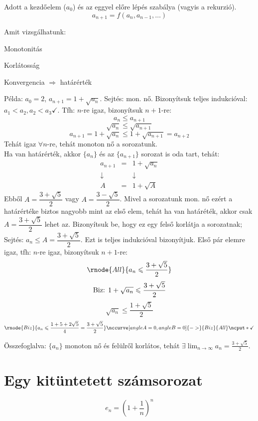\documentclass[a4paper,12pt,twoside]{book}
\theoremstyle{break}
\theoremstyle{plain}
\begin{document}
Adott a kezdőelem ($a_0$) és az eggyel előre lépés szabálya (vagyis a rekurzió).
\[a_{n+1} = f(a_n, a_{n-1}, \ldots)\]

Amit vizsgálhatunk:
\begin{itemize*}
 \item Monotonitás
 \item Korlátosság
 \item Konvergencia $\Rightarrow$ határérték
\end{itemize*}

Példa: $a_0 = 2$, $a_{n+1} = 1+\sqrt{a_n}$. Sejtés: mon. nő. Bizonyítsuk teljes indukcióval:
$a_1 < a_2, a_2 < a_3 \checkmark$. Tfh: $n$-re igaz, bizonyítsuk $n+1$-re:
\[a_n \leqslant a_{n+1}\]
\[\sqrt{a_n} \leqslant \sqrt{a_{n+1}}\]
\[a_{n+1}=1+\sqrt{a_n} \leqslant 1+\sqrt{a_{n+1}} = a_{n+2}\]
Tehát igaz $\forall n$-re, tehát monoton nő a sorozatunk.\\

Ha van határérték, akkor $\{a_n\}$ és az $\{a_{n+1}\}$ sorozat is oda tart, tehát:
\[\begin{array}{ccc}
   a_{n+1} & = & 1+\sqrt{a_n}\\
   \downarrow && \downarrow\\
   A & = & 1+ \sqrt{A}
  \end{array}
\]
Ebből $A=\dfrac{3+\sqrt{5}}{2}$ vagy $A=\dfrac{3-\sqrt{5}}{2}$. Mivel a sorozatunk mon. nő ezért a határértéke biztos nagyobb mint az első elem, tehát ha van határéték, akkor csak $A=\dfrac{3+\sqrt{5}}{2}$ lehet az. Bizonyítsuk be, hogy ez egy felső korlátja a sorozatnak; Sejtés: $a_n \leqslant A = \dfrac{3+\sqrt{5}}{2}$. Ezt is teljes indukcióval bizonyítjuk. Első pár elemre igaz, tfh: $n$-re igaz, bizonyítsuk $n+1$-re:
\[\rnode{All}{a_n \leqslant \dfrac{3+\sqrt{5}}{2}}\]
\[\hbox{Biz: }1+\sqrt{a_n} \leqslant \dfrac{3+\sqrt{5}}{2}\]
\[\sqrt{a_n} \leqslant \dfrac{1+\sqrt{5}}{2}\]
\[\rnode{Biz}{a_n \leqslant \dfrac{1+5+2\sqrt{5}}{4} = \frac{3+\sqrt{5}}{2}} \nccurve[angleA=0, angleB=0]{->}{Biz}{All} \ncput*{\checkmark}\]

Összefoglalva: $\{a_n\}$ monoton nő és felülről korlátos, tehát $\displaystyle \exists \lim_{n\to\infty} a_n = \frac{3+\sqrt{5}}{2}$.

\section{Egy kitüntetett számsorozat}

\[\boxed{e_n = \left(1+\frac{1}{n}\right)^n}\]
\end{document}
